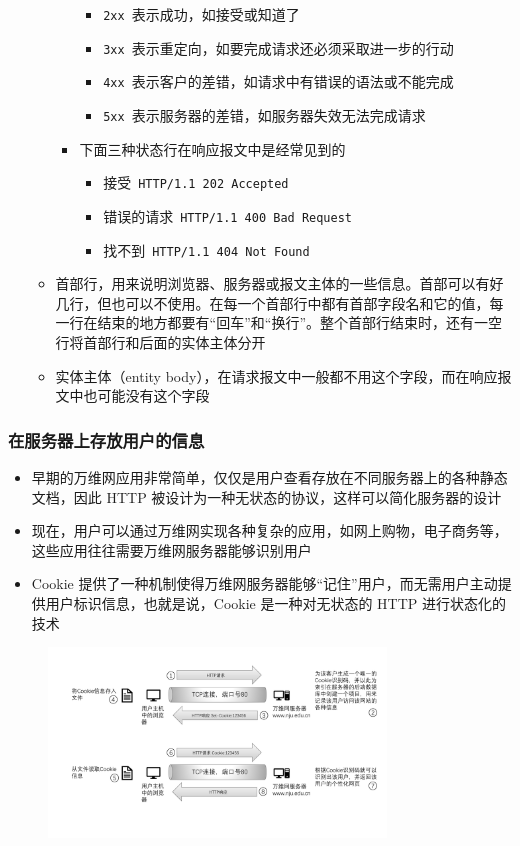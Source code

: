 \documentclass[cs4size,a4paper,10pt]{ctexart}
\begin{document}
\begin{itemize}
\begin{itemize}
\begin{itemize}
\begin{itemize}
					\item \verb|2xx|\ 表示成功，如接受或知道了
					\item \verb|3xx|\ 表示重定向，如要完成请求还必须采取进一步的行动
					\item \verb|4xx|\ 表示客户的差错，如请求中有错误的语法或不能完成
					\item \verb|5xx|\ 表示服务器的差错，如服务器失效无法完成请求
				\end{itemize}
				\item 下面三种状态行在响应报文中是经常见到的
				\begin{itemize}
					\item 接受\ \verb|HTTP/1.1 202 Accepted|
					\item 错误的请求\ \verb|HTTP/1.1 400 Bad Request|
					\item 找不到\ \verb|HTTP/1.1 404 Not Found|
				\end{itemize}
			\end{itemize}
			\item 首部行，用来说明浏览器、服务器或报文主体的一些信息。首部可以有好几行，但也可以不使用。在每一个首部行中都有首部字段名和它的值，每一行在结束的地方都要有“回车”和“换行”。整个首部行结束时，还有一空行将首部行和后面的实体主体分开
			\item 实体主体（entity body），在请求报文中一般都不用这个字段，而在响应报文中也可能没有这个字段
		\end{itemize}
	\end{itemize}

	\subsubsection{在服务器上存放用户的信息}

	\begin{itemize}
		\item 早期的万维网应用非常简单，仅仅是用户查看存放在不同服务器上的各种静态文档，因此 HTTP 被设计为一种无状态的协议，这样可以简化服务器的设计
		\item 现在，用户可以通过万维网实现各种复杂的应用，如网上购物，电子商务等，这些应用往往需要万维网服务器能够识别用户
		\item Cookie 提供了一种机制使得万维网服务器能够“记住”用户，而无需用户主动提供用户标识信息，也就是说，Cookie 是一种对无状态的 HTTP 进行状态化的技术
	\end{itemize}

	\begin{figure}[H]
		\centering
		\includegraphics[width=0.8\textwidth]{img/6.4.3.4}
	\end{figure}
\end{document}
